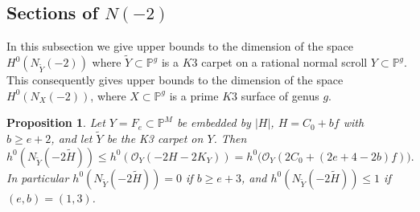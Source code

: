 \documentclass[11pt,twoside]{amsart}
\theoremstyle{plain}
\newtheorem{proposition}[theorem]{Proposition}
\theoremstyle{definition}
\newcommand{\PM}{\mathbb{P}^M}
\newcommand{\OO}{\mathcal{O}}
\newcommand{\Yt}{\widetilde{Y}}
\newcommand{\Ht}{\widetilde{H}}
\newcommand{\NYt}{N_{\Yt}}
\begin{document}
\subsection{Sections of \texorpdfstring{$N(-2)$}{N(-2)}}

In this subsection we give upper bounds to the dimension of the space $H^0(N_{\widetilde Y}(-2))$ where $\widetilde Y \subset \mathbb{P}^g$ is a $K3$ carpet on a rational normal scroll $Y \subset \mathbb{P}^g$. This consequently gives upper bounds to the dimension of the space $H^0(N_{X}(-2))$, where $X \subset \mathbb{P}^g$ is a prime $K3$ surface of genus $g$. 

\begin{proposition}\label{prop:N2}
Let $Y=F_e\subset\PM$ be embedded by $|H|$, $H=C_0+bf$ with $b\ge e+2$, and let $\Yt$ be the K3 carpet on $Y$. Then
\[
h^0(\NYt(-2\Ht))\le h^0(\OO_Y(-2H-2K_Y))=h^0\big(\OO_Y(2C_0+(2e+4-2b)f)\big).
\]
In particular $h^0(\NYt(-2\Ht))=0$ if $b\ge e+3$, and $h^0(\NYt(-2\Ht))\le1$ if $(e,b)=(1,3)$.
\end{proposition}
\end{document}

